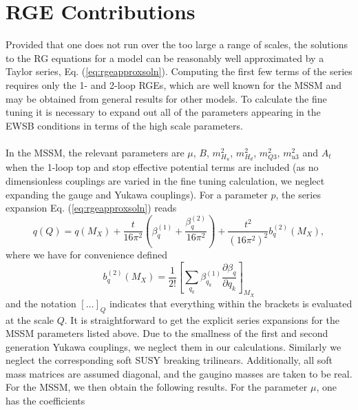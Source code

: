 \documentclass[preprint,amsmath,amssymb,aps,superscriptaddress,prd,showpacs,floatfix]{revtex4-1}
\begin{document}
\section{\label{app:rges}RGE Contributions}
Provided that one does not run over the too large a range of scales, the solutions to the
RG equations for a model can be reasonably well approximated by a Taylor series, Eq. (\ref{eq:rgeapproxsoln}).
Computing the first few terms of the series requires only the 1- and 2-loop RGEs, which are well known for
the MSSM and may be obtained from general results \cite{Martin:1993zk} for other models. To calculate the fine
tuning it is necessary to expand out all of the parameters appearing in the EWSB conditions in terms
of the high scale parameters.\\ \\
In the MSSM, the relevant parameters are $\mu$, $B$, $m_{H_u}^2$, $m_{H_d}^2$, $m_{Q3}^2$, $m_{u3}^2$ and $A_t$ when
the 1-loop top and stop effective potential terms are included (as no dimensionless couplings are varied
in the fine tuning calculation, we neglect expanding the gauge and Yukawa couplings). For a parameter $p$, the series expansion
Eq. (\ref{eq:rgeapproxsoln}) reads
\begin{equation*}
q(Q)=q(M_X)+\frac{t}{16\pi^2}\left ( \beta_q^{(1)}+\frac{\beta_q^{(2)}}{16\pi^2}\right )+\frac{t^2}{(16\pi^2)^2}b_q^{(2)}(M_X),
\end{equation*}
where we have for convenience defined
\begin{equation*}
b_q^{(2)}(M_X)=\frac{1}{2!}\left [ \sum_{q_k}\beta_{q_k}^{(1)}\frac{\partial \beta_q}{\partial q_k}\right ]_{M_X}
\end{equation*}
and the notation $[\ldots]_Q$ indicates that everything within the brackets is evaluated at the scale $Q$. It is straightforward 
to get the explicit series expansions for the MSSM parameters listed above. Due to the smallness of the first and second
generation Yukawa couplings, we neglect them in our calculations. Similarly we neglect the corresponding soft SUSY breaking 
trilinears. Additionally, all soft mass matrices are assumed diagonal, and the gaugino masses are taken to be real.
For the MSSM, we then obtain the following results. For the parameter $\mu$, one has the coefficients
\end{document}
